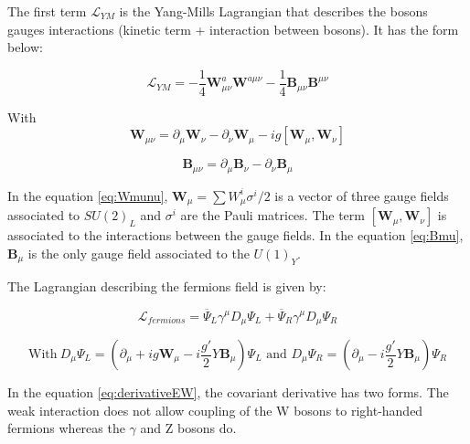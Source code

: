     The first term $\mathcal{L}_{YM}$ is the Yang-Mills Lagrangian that describes the bosons gauges interactions (kinetic term + interaction between bosons). 
    It has the form below:

    \begin{equation}
      \mathcal{L}_{YM} = - \frac{1}{4}\textbf{W}^a_{\mu\nu} \textbf{W}^{a\mu\nu} - \frac{1}{4}\textbf{B}_{\mu\nu}\textbf{B}^{\mu\nu}
    \end{equation}

    With 
    \begin{equation}
        \textbf{W}_{\mu\nu}  =  \partial_{\mu}\textbf{W}_{\nu} - \partial_{\nu}\textbf{W}_{\mu} - i g [\textbf{W}_{\mu},\textbf{W}_{\nu}]
      \label{eq:Wmunu}
    \end{equation}

    \begin{equation}
        \textbf{B}_{\mu\nu}  =  \partial_{\mu}\textbf{B}_{\nu} - \partial_{\nu}\textbf{B}_{\mu}
        \label{eq:Bmu}
    \end{equation}
    
    In the equation \ref{eq:Wmunu}, $\textbf{W}_{\mu} = \sum W^i_{\mu}\sigma^i/2$ is a vector of three gauge fields associated to $SU(2)_L$ and $\sigma^i$ are the Pauli matrices. 
    The term $[\textbf{W}_{\mu},\textbf{W}_{\nu}]$ is associated to the interactions between the gauge fields.
    In the equation \ref{eq:Bmu}, $\textbf{B}_{\mu}$ is the only gauge field associated to the $U(1)_Y$.

    The Lagrangian describing the fermions field is given by:

    \begin{equation}
      \mathcal{L}_{fermions} = \overline{\Psi}_L\gamma^{\mu}D_{\mu}\Psi_L + \overline{\Psi}_R\gamma^{\mu}D_{\mu}\Psi_R
    \end{equation}
      
    \begin{equation}
      \text{With} \ D_{\mu}\Psi_L = \left( \partial_{\mu} + ig \textbf{W}_{\mu} - i \frac{g'}{2}Y\textbf{B}_{\mu}\right)\Psi_L \text{ and } D_{\mu}\Psi_R = \left(\partial_{\mu} - i\frac{g'}{2}Y\textbf{B}_{\mu}\right)\Psi_R
      \label{eq:derivativeEW}
    \end{equation}
    
    In the equation \ref{eq:derivativeEW}, the covariant derivative has two forms. 
    The weak interaction does not allow coupling of the W bosons to right-handed fermions whereas the $\gamma$ and Z bosons do.

